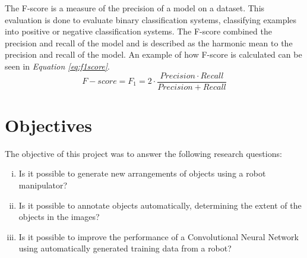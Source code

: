 The F-score is a measure of the precision of a model on a dataset. This evaluation is done to evaluate binary classification systems, classifying examples into positive or negative classification systems. 
The F-score combined the precision and recall of the model and is described as the harmonic mean to the precision and recall of the model\cite{wood_f-score_2019}.
An example of how F-score is calculated can be seen in \textit{Equation \ref{eq:f1score}}.
\begin{equation}
  F- score = F_1 = 2 \cdot \frac{Precision \cdot Recall}{Precision + Recall}
  \label{eq:f1score}
\end{equation}


\section{Objectives}
The objective of this project was to answer the following research questions:
\begin{enumerate}[i.]
  \item Is it possible to generate new arrangements of objects using a robot manipulator?
  \item Is it possible to annotate objects automatically, determining the extent of the objects in the images?
  \item Is it possible to improve the performance of a Convolutional Neural Network using automatically generated training data from a robot? %
\end{enumerate}
